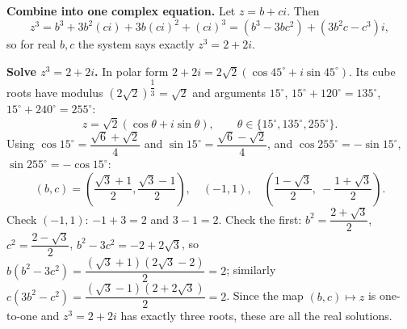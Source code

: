 \textbf{Combine into one complex equation.} Let $z=b+ci$. Then
\[
z^3=b^3+3b^2(ci)+3b(ci)^2+(ci)^3=\left(b^3-3bc^2\right)+\left(3b^2c-c^3\right)i ,
\]
so for real $b,c$ the system says exactly $z^3=2+2i$.

\textbf{Solve $z^3=2+2i$.} In polar form $2+2i=2\sqrt2\left(\cos45^\circ+i\sin45^\circ\right)$. Its cube roots have modulus $\left(2\sqrt2\right)^{\dfrac{1}{3}}=\sqrt2$ and arguments $15^\circ$, $15^\circ+120^\circ=135^\circ$, $15^\circ+240^\circ=255^\circ$:
\[
z=\sqrt2\left(\cos\theta+i\sin\theta\right),\qquad\theta\in\{15^\circ,135^\circ,255^\circ\}.
\]
Using $\cos15^\circ=\dfrac{\sqrt6+\sqrt2}{4}$ and $\sin15^\circ=\dfrac{\sqrt6-\sqrt2}{4}$, and $\cos255^\circ=-\sin15^\circ$, $\sin255^\circ=-\cos15^\circ$:
\[
\boxed{(b,c)=\left(\dfrac{\sqrt3+1}{2},\dfrac{\sqrt3-1}{2}\right),\quad(-1,1),\quad\left(\dfrac{1-\sqrt3}{2},\ -\dfrac{1+\sqrt3}{2}\right).}
\]
Check $(-1,1)$: $-1+3=2$ and $3-1=2$. Check the first: $b^2=\dfrac{2+\sqrt3}{2}$, $c^2=\dfrac{2-\sqrt3}{2}$, $b^2-3c^2=-2+2\sqrt3$, so $b(b^2-3c^2)=\dfrac{(\sqrt3+1)(2\sqrt3-2)}{2}=2$; similarly $c(3b^2-c^2)=\dfrac{(\sqrt3-1)(2+2\sqrt3)}{2}=2$. Since the map $(b,c)\mapsto z$ is one-to-one and $z^3=2+2i$ has exactly three roots, these are all the real solutions.
